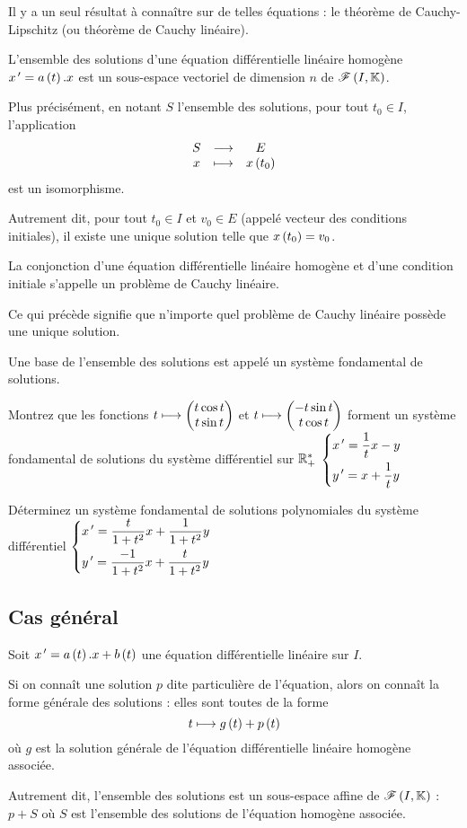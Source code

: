 Il y a un seul résultat à connaître sur de telles équations : le théorème de Cauchy-Lipschitz (ou théorème de Cauchy linéaire).

\begin{theo}
L'ensemble des solutions d'une équation différentielle linéaire homogène \(x^{\,\prime}=a\left(t\right).x\) est un sous-espace vectoriel de dimension \(n\) de \(\mathscr{F}\left(I,\mathbb{K}\right)\).

Plus précisément, en notant \(S\) l'ensemble des solutions, pour tout \(t_0\in I\), l'application \[\begin{array}[t]{ccc}S & \longrightarrow & E \\ x & \longmapsto & x\left(t_0\right)\end{array}\] est un isomorphisme.

Autrement dit, pour tout \(t_0\in I\) et \(v_0\in E\) (appelé vecteur des conditions initiales), il existe une unique solution telle que \(x\left(t_0\right)=v_0\).
\end{theo}

La conjonction d'une équation différentielle linéaire homogène et d'une condition initiale s'appelle un problème de Cauchy linéaire.

Ce qui précède signifie que n'importe quel problème de Cauchy linéaire possède une unique solution.

Une base de l'ensemble des solutions est appelé un système fondamental de solutions.

\begin{exo}
Montrez que les fonctions \(t\longmapsto\begin{pmatrix}t\cos t\\t\sin t\end{pmatrix}\) et \(t\longmapsto\begin{pmatrix}-t\sin t\\t\cos t\end{pmatrix}\) forment un système fondamental de solutions du système différentiel sur \(\mathbb{R}_+^*\) \(\begin{dcases}
    x^{\,\prime}=\dfrac{1}{t}x-y \\
    y^{\,\prime}=x+\dfrac{1}{t}y
\end{dcases}\)
\end{exo}

\begin{exo}
Déterminez un système fondamental de solutions polynomiales du système différentiel \(\begin{dcases}
    x^{\,\prime}=\dfrac{t}{1+t^2}x+\dfrac{1}{1+t^2}y \\
    y^{\,\prime}=\dfrac{-1}{1+t^2}x+\dfrac{t}{1+t^2}y
\end{dcases}\)
\end{exo}

\subsection{Cas général}

\begin{prop}
Soit \(x^{\,\prime}=a\left(t\right).x+b\left(t\right)\) une équation différentielle linéaire sur \(I\).

Si on connaît une solution \(p\) dite particulière de l'équation, alors on connaît la forme générale des solutions : elles sont toutes de la forme \[t\longmapsto g\left(t\right)+p\left(t\right)\] où \(g\) est la solution générale de l'équation différentielle linéaire homogène associée.

Autrement dit, l'ensemble des solutions est un sous-espace affine de \(\mathscr{F}\left(I,\mathbb{K}\right)\) : \(p+S\) où \(S\) est l'ensemble des solutions de l'équation homogène associée.
\end{prop}

